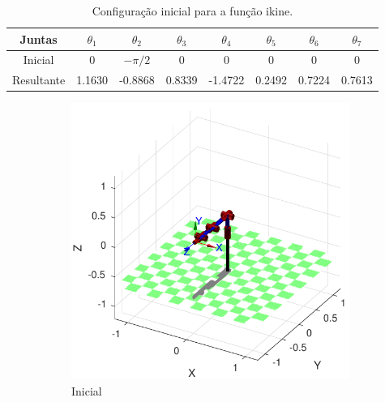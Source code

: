 \documentclass[a4paper,11pt]{article}
\theoremstyle{mytheor}
\begin{document}
\begin{table}[!ht]
\centering
\caption{Configuração inicial para a função ikine.}
\label{tab:ex5_ikine_configuracao}

\begin{tabular}{|c|c|c|c|c|c|c|c|}
\hline
Juntas  & $\theta_1$ & $\theta_2$ & $\theta_3$ & $\theta_4$ & $\theta_5$ & $\theta_6$ & $\theta_7$ \\ \hline
Inicial     & 0 & $-\pi /2$ & 0 & 0 & 0 & 0 & 0 \\ \hline
Resultante     & 1.1630 & -0.8868 & 0.8339 & -1.4722 & 0.2492 & 0.7224 & 0.7613 \\ \hline
\end{tabular}
\end{table}


\begin{figure}[!ht]
\centering
  \begin{minipage}{\linewidth}
  \centering
    \begin{subfigure}[b]{0.45\textwidth}
    \includegraphics[width=1\textwidth]{figs/ex5_inicial.pdf}
    \caption{Inicial}
    \end{subfigure}
    \begin{subfigure}[b]{0.45\textwidth}

\end{subfigure}
\end{minipage}
\end{figure}
\end{document}
